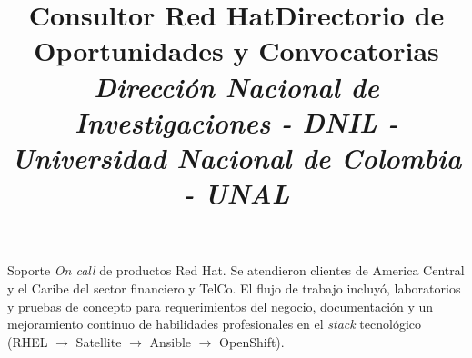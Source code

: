 \documentclass[overlapped,line,final]{../../templates/MichaelDeCorteCV/lib/res}
\begin{document}
\begin{resume}
\title{\bf Consultor Red Hat}
\begin{position}
	Soporte \textit{On call} de productos Red Hat. Se atendieron clientes de America Central y el Caribe del sector financiero y TelCo. El flujo de trabajo incluyó, laboratorios y pruebas de concepto para requerimientos del negocio, documentación y un mejoramiento continuo de habilidades profesionales en el \textit{stack} tecnológico (RHEL $\rightarrow$ Satellite $\rightarrow$ Ansible $\rightarrow$ OpenShift).
\end{position}



\title{\bf Directorio de Oportunidades y Convocatorias
		\newline \em Dirección Nacional de Investigaciones - DNIL - Universidad Nacional de Colombia - UNAL
}


\end{resume}
\end{document}
